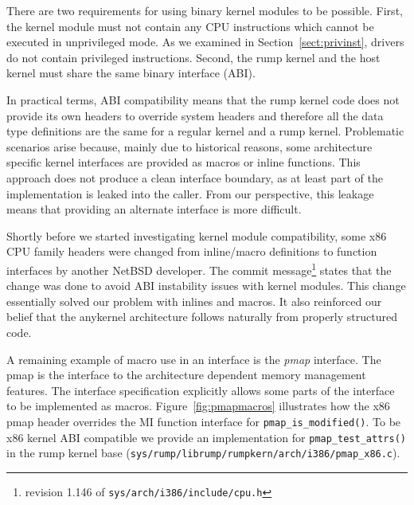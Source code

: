 There are two requirements for using binary kernel modules to be possible.
First, the kernel module must not contain any CPU instructions
which cannot be executed in unprivileged mode.  As we examined in
Section~\ref{sect:privinst}, drivers do not contain privileged
instructions.  Second, the rump kernel and the host kernel must share
the same binary interface (ABI).

In practical terms, ABI compatibility means that the rump kernel
code does not provide its own headers to override system headers and therefore
all the data type definitions are the same for a regular kernel
and a rump kernel.  Problematic scenarios arise because, mainly due to historical reasons,
some architecture specific kernel interfaces are provided as macros
or inline functions.  This approach does
not produce a clean interface boundary, as at least part of the
implementation is leaked into the caller.  From our perspective,
this leakage means that providing an alternate interface is more difficult.

Shortly before we started investigating kernel module compatibility,
some x86 CPU family headers were changed from inline/macro definitions
to function interfaces by another NetBSD developer.  The commit message\footnote
{
	revision 1.146 of \texttt{sys/arch/i386/include/cpu.h}
}
states that the change was done to avoid ABI instability issues with
kernel modules.  This change essentially solved our problem with
inlines and macros.  It also
reinforced our belief that the anykernel architecture follows naturally
from properly structured code.

A remaining example of macro use in an interface is the \textit{pmap}
interface.  The pmap is the interface to the architecture dependent
memory management features.  The interface specification explicitly
allows some parts of the interface to be implemented as macros.
Figure~\ref{fig:pmapmacros} illustrates how the x86 pmap header
overrides the MI function interface for \verb+pmap_is_modified()+.
To be x86 kernel ABI compatible we provide an implementation
for \verb+pmap_test_attrs()+ in the rump kernel base
(\verb+sys/rump/librump/rumpkern/arch/i386/pmap_x86.c+).

